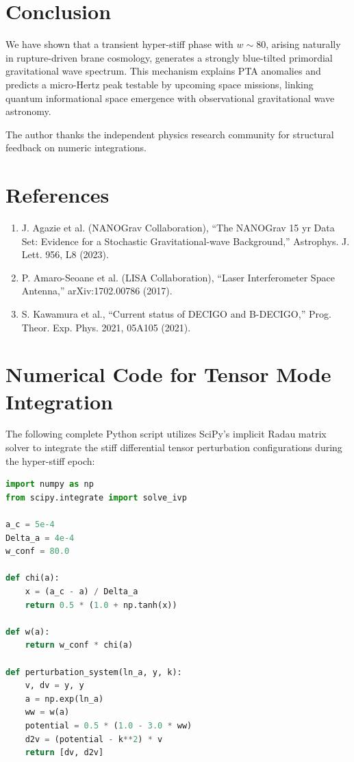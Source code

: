 \documentclass[twocolumn, PRD, amsmath, amssymb, aps, nofootinbib]{revtex4-2}
\begin{document}
\section{Conclusion}
We have shown that a transient hyper-stiff phase with $w \sim 80$, arising naturally in rupture-driven brane cosmology, generates a strongly blue-tilted primordial gravitational wave spectrum. This mechanism explains PTA anomalies and predicts a micro-Hertz peak testable by upcoming space missions, linking quantum informational space emergence with observational gravitational wave astronomy.

\begin{acknowledgments}
The author thanks the independent physics research community for structural feedback on numeric integrations.
\end{acknowledgments}

\section*{References}
\begin{enumerate}
    \item J. Agazie et al. (NANOGrav Collaboration), ``The NANOGrav 15 yr Data Set: Evidence for a Stochastic Gravitational-wave Background,'' Astrophys. J. Lett. 956, L8 (2023).
    \item P. Amaro-Seoane et al. (LISA Collaboration), ``Laser Interferometer Space Antenna,'' arXiv:1702.00786 (2017).
    \item S. Kawamura et al., ``Current status of DECIGO and B-DECIGO,'' Prog. Theor. Exp. Phys. 2021, 05A105 (2021).
\end{enumerate}

\appendix
\section{Numerical Code for Tensor Mode Integration}
\label{app:code}
The following complete Python script utilizes SciPy's implicit Radau matrix solver to integrate the stiff differential tensor perturbation configurations during the hyper-stiff epoch:

\begin{lstlisting}[language=Python]
import numpy as np
from scipy.integrate import solve_ivp

a_c = 5e-4
Delta_a = 4e-4
w_conf = 80.0

def chi(a):
    x = (a_c - a) / Delta_a
    return 0.5 * (1.0 + np.tanh(x))

def w(a):
    return w_conf * chi(a)

def perturbation_system(ln_a, y, k):
    v, dv = y, y
    a = np.exp(ln_a)
    ww = w(a)
    potential = 0.5 * (1.0 - 3.0 * ww)
    d2v = (potential - k**2) * v
    return [dv, d2v]
\end{lstlisting}
\end{document}
